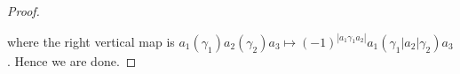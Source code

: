 \documentclass{scrartcl}
\theoremstyle{plain}
\theoremstyle{definition}
\newcommand{\abs}[1]{\left\lvert#1\right\rvert}
\DeclareMathOperator{\id}{id}
\begin{document}
\begin{proof}
    \begin{center}
    \end{center}
    where the right vertical map is $a_1(\gamma_1)a_2(\gamma_2)a_3 \mapsto (-1)^{\abs{a_1\gamma_1a_2}} a_1(\gamma_1|a_2|\gamma_2)a_3$. Hence we are done.
\end{proof}
\end{document}
